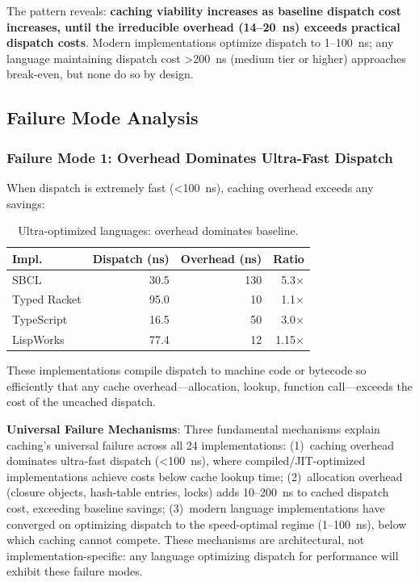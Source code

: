 \documentclass[sigplan,final,acmsmall,review,screen]{acmart}
\begin{document}
The pattern reveals: \textbf{caching viability increases as baseline dispatch cost increases, until the irreducible overhead (14--20~ns) exceeds
practical dispatch costs}. Modern implementations optimize dispatch to 1--100~ns; any language maintaining dispatch cost >200~ns (medium tier or higher)
approaches break-even, but none do so by design.

\subsection{Failure Mode Analysis}

\subsubsection{Failure Mode 1: Overhead Dominates Ultra-Fast Dispatch}

When dispatch is extremely fast (<100~ns), caching overhead exceeds any savings:

\begin{table}[h!]
\centering
\small
\caption{Ultra-optimized languages: overhead dominates baseline.}
\label{tab:mode1}
\begin{tabular}{@{}lrrr@{}}
\toprule
\textbf{Impl.} & \textbf{Dispatch (ns)} & \textbf{Overhead (ns)} & \textbf{Ratio} \\
\midrule
SBCL & 30.5 & 130 & 5.3× \\
Typed Racket & 95.0 & 10 & 1.1× \\
TypeScript & 16.5 & 50 & 3.0× \\
LispWorks & 77.4 & 12 & 1.15× \\
\bottomrule
\end{tabular}
\end{table}

These implementations compile dispatch to machine code or bytecode so efficiently that any
cache overhead—allocation, lookup, function call—exceeds the cost of the uncached dispatch.

\textbf{Universal Failure Mechanisms}: Three fundamental mechanisms explain caching's universal failure across all 24 implementations:
(1)~caching overhead dominates ultra-fast dispatch (<100~ns), where compiled/JIT-optimized implementations achieve costs below cache lookup time;
(2)~allocation overhead (closure objects, hash-table entries, locks) adds 10--200~ns to cached dispatch cost, exceeding baseline savings;
(3)~modern language implementations have converged on optimizing dispatch to the speed-optimal regime (1--100~ns), below which caching cannot compete.
These mechanisms are architectural, not implementation-specific: any language optimizing dispatch for performance will exhibit these failure modes.
\end{document}
